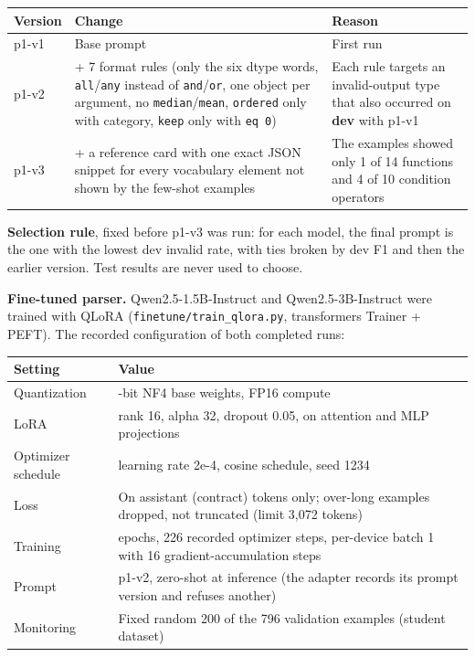 \documentclass[11pt]{article}
\begin{document}
\begin{table}[!tp]
\centering\footnotesize\setlength{\tabcolsep}{3pt}\renewcommand{\arraystretch}{1.1}
\begin{tabularx}{\textwidth}{l>{\raggedright\arraybackslash}X>{\raggedright\arraybackslash}X}
\toprule
\textbf{Version} & \textbf{Change} & \textbf{Reason} \\
\midrule
p1-v1 & Base prompt & First run \\
p1-v2 & + 7 format rules (only the six dtype words, \texttt{all}/\texttt{any} instead of \texttt{and}/\texttt{or}, one object per argument, no \texttt{median}/\texttt{mean}, \texttt{ordered} only with category, \texttt{keep} only with \texttt{eq 0}) & Each rule targets an invalid-output type that also occurred on \textbf{dev} with p1-v1 \\
p1-v3 & + a reference card with one exact JSON snippet for every vocabulary element not shown by the few-shot examples & The examples showed only 1 of 14 functions and 4 of 10 condition operators \\
\bottomrule
\end{tabularx}
\end{table}

\textbf{Selection rule}, fixed before p1-v3 was run: for each model, the
final prompt is the one with the lowest dev invalid rate, with ties
broken by dev F1 and then the earlier version. Test results are never
used to choose.

\textbf{Fine-tuned parser.} Qwen2.5-1.5B-Instruct and
Qwen2.5-3B-Instruct were trained with QLoRA
(\texttt{finetune/\allowbreak{}train\_\allowbreak{}qlora.\allowbreak{}py},
transformers Trainer + PEFT). The recorded configuration of both
completed runs:

\begin{table}[!tp]
\centering\footnotesize\setlength{\tabcolsep}{3pt}\renewcommand{\arraystretch}{1.1}
\begin{tabularx}{\textwidth}{l>{\raggedright\arraybackslash}X}
\toprule
\textbf{Setting} & \textbf{Value} \\
\midrule
Quantization & 4-bit NF4 base weights, FP16 compute \\
LoRA & rank 16, alpha 32, dropout 0.05, on attention and MLP projections \\
Optimizer schedule & learning rate 2e-4, cosine schedule, seed 1234 \\
Loss & On assistant (contract) tokens only; over-long examples dropped, not truncated (limit 3,072 tokens) \\
Training & 2 epochs, 226 recorded optimizer steps, per-device batch 1 with 16 gradient-accumulation steps \\
Prompt & p1-v2, zero-shot at inference (the adapter records its prompt version and refuses another) \\
Monitoring & Fixed random 200 of the 796 validation examples (student dataset) \\
\bottomrule
\end{tabularx}
\end{table}
\end{document}
